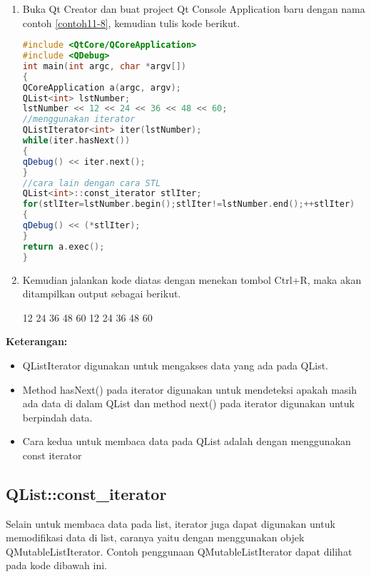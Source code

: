 \begin{enumerate}

\item
  Buka Qt Creator dan buat project Qt Console Application baru dengan
  nama contoh \ref{contoh11-8}, kemudian tulis kode berikut.

\begin{lstlisting}[language=c++, caption=Menggunakan object Iterator, label=contoh11-8]
#include <QtCore/QCoreApplication>
#include <QDebug>
int main(int argc, char *argv[])
{
QCoreApplication a(argc, argv);
QList<int> lstNumber;
lstNumber << 12 << 24 << 36 << 48 << 60;
//menggunakan iterator
QListIterator<int> iter(lstNumber);
while(iter.hasNext())
{
qDebug() << iter.next();
}
//cara lain dengan cara STL
QList<int>::const_iterator stlIter;
for(stlIter=lstNumber.begin();stlIter!=lstNumber.end();++stlIter)
{
qDebug() << (*stlIter);
}
return a.exec();
}
\end{lstlisting}
\item
  Kemudian jalankan kode diatas dengan menekan tombol Ctrl+R, maka akan
  ditampilkan output sebagai berikut.

\begin{lcverbatim}
12
24
36
48
60
12
24
36
48
60
\end{lcverbatim}
\end{enumerate}

\textbf{Keterangan:}

\begin{itemize}

\item
  QListIterator digunakan untuk mengakses data yang ada pada QList.
\item
  Method hasNext() pada iterator digunakan untuk mendeteksi apakah masih
  ada data di dalam QList dan method next() pada iterator digunakan
  untuk berpindah data.
\item
  Cara kedua untuk membaca data pada QList adalah dengan menggunakan
  const iterator
\end{itemize}

\subsection{QList::const\_iterator}

Selain untuk membaca data pada list, iterator juga dapat digunakan untuk
memodifikasi data di list, caranya yaitu dengan menggunakan objek
QMutableListIterator. Contoh penggunaan QMutableListIterator dapat
dilihat pada kode dibawah ini.

